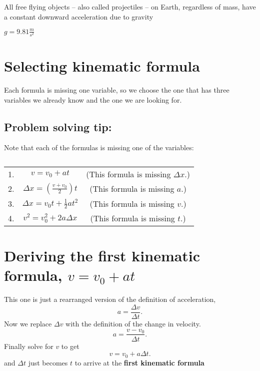 \begin{definition}
	All free flying objects -- also called projectiles -- on Earth, regardless of mass,
	have a constant downward acceleration due to gravity
\end{definition}

\begin{constant}
	$g = 9.81 \frac{m}{s^2}$
\end{constant}

\section{Selecting kinematic formula}%
\label{sec:selecting_kinematic_formula}

Each formula is missing one variable, so we choose the one that has three variables we
already know and the one we are looking for.
\subsection{Problem solving tip:}%
\label{sub:problem_solving_tip_}

Note that each of the formulas is missing one of the variables:
\begin{table}[htpb]
	\centering
	\caption{}
	\label{tab:label}
	\begin{tabular}{l c c}
		1. & $v = v_0 + at$ & (This formula is missing $\Delta x$.)  \\
		2. & $\Delta x = \left( \frac{v + v_0}{2} \right) t $ & (This formula is missing $a$.)   \\
		3. & $\Delta x = v_0 t + \frac{1}{2} a t^2$   & (This formula is missing $v$.)  \\
		4. & $v^2 = v_0^2 + 2a \Delta x$  &  (This formula is missing $t$.)\\
	\end{tabular}
\end{table}
\section{Deriving the first kinematic formula, $v = v_0 + at$}%
\label{sec:deriving_the_first_kinematic_formula_v_v_0_at_}

This one is just a rearranged version of the definition of acceleration, \[
	a = \frac{\Delta v}{\Delta t}
	.\] Now we replace $\Delta v$ with the definition of the change in velocity. \[
	a = \frac{v - v_0}{\Delta t}
	.\] Finally solve for $v$ to get \[
	v = v_0 + a \Delta t
.\] and $\Delta t$ just becomes $t$ to arrive at the \textbf{first kinematic formula}

